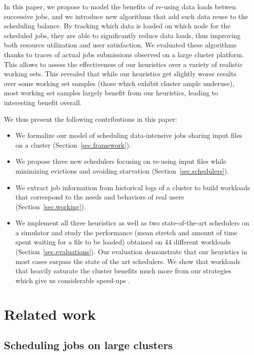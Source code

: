 \documentclass[conference,10pt]{IEEEtran}
\begin{document}
In this paper, we propose to model the benefits of re-using data loads
betwen successive jobs, and we introduce new algorithms that add such
data reuse to the scheduling balance. By tracking which data is loaded
on which node for the scheduled jobs, they are able to significantly
reduce data loads, thus improving both resource utilization and user
satisfaction. We evaluated these algorithms thanks to traces of actual
jobs submissions observed on a large cluster platform. This allows to
assess the effectiveness of our heuristics over a variety of realistic
working sets. This revealed that while our heuristics get slightly worse
results over some working set samples (those which exhibit cluster ample
underuse), most working set samples largely benefit from our heuristics,
leading to interesting benefit overall.

We thus present the following contributions in this paper:
\begin{itemize}
	\item We formalize our model of scheduling data-intensive jobs sharing input files on a cluster (Section~\ref{sec.framework}).
	\item We propose three new schedulers focusing on re-using input files while minimizing evictions and avoiding starvation (Section~\ref{sec.schedulers}).
	\item We extract job information from historical logs of a cluster to build workloads that correspond to the needs and behaviors of real users (Section~\ref{sec.working}).
	\item We implement all three heuristics as well as two state-of-the-art schedulers on a simulator and study the performance (mean stretch and amount of time spent waiting for a file to be loaded) obtained on 44 different workloads (Section~\ref{sec.evaluations}).
	Our evaluation demonstrate that our heuristics in most cases surpass the state of the art schedulers.
	We show that workloads that heavily saturate the cluster
                benefits much more from our strategies which give us
                considerable speed-ups .
\end{itemize}

\section{Related work}\label{sec.related_work}

\subsection{Scheduling jobs on large clusters}
\end{document}

